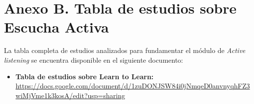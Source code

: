 \section*{Anexo B. Tabla de estudios sobre Escucha Activa}
\label{anexo:active_listening}

La tabla completa de estudios analizados para fundamentar el módulo de \textit{Active listening} se encuentra disponible en el siguiente documento:

\begin{itemize}
    \item \textbf{Tabla de estudios sobre Learn to Learn:} \url{https://docs.google.com/document/d/1zuDONJSW84i0jNmqeD0anvnyqhFZ3wiMjVme1k3kosA/edit?usp=sharing}
\end{itemize}